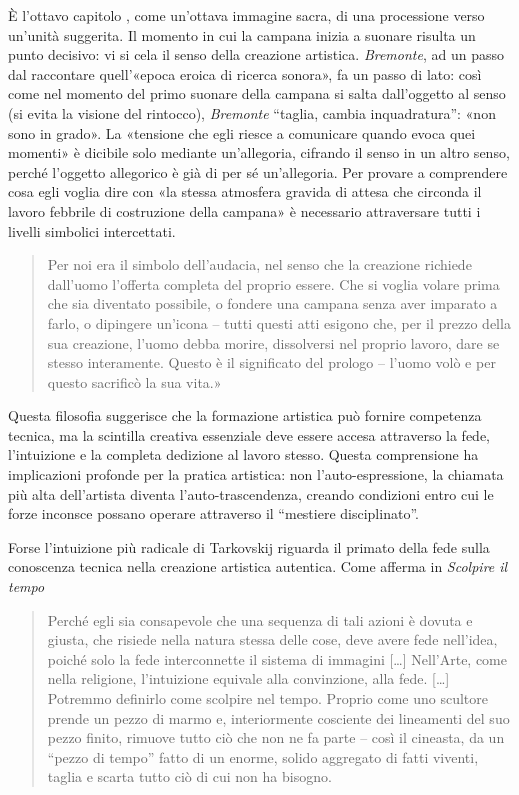 È l'ottavo capitolo \cite{tarkovskij1966}, come un'ottava immagine sacra, di una processione verso un'unità
suggerita. Il momento in cui la campana inizia a suonare risulta un
punto decisivo: vi si cela il senso della creazione artistica. \emph{Bremonte},
ad un passo dal raccontare quell'«epoca eroica di ricerca sonora», fa un
passo di lato: così come nel momento del primo suonare della
campana si salta dall'oggetto al senso (si evita la visione del rintocco), \emph{Bremonte} “taglia, cambia inquadratura”: «non sono in grado». La «tensione
che egli riesce a comunicare quando evoca quei momenti» è dicibile solo mediante
un'allegoria, cifrando il senso in un altro senso, perché l'oggetto allegorico è
già di per sé un'allegoria. Per provare a comprendere cosa egli voglia dire con «la
stessa atmosfera gravida di attesa che circonda il lavoro febbrile di
costruzione della campana» è necessario attraversare tutti i livelli simbolici
intercettati.

\begin{quote}
  Per noi era il simbolo dell'audacia, nel senso che la creazione richiede
  dall'uomo l'offerta completa del proprio essere. Che si voglia volare prima
  che sia diventato possibile, o fondere una campana senza aver imparato a
  farlo, o dipingere un'icona -- tutti questi atti esigono che, per il prezzo della
  sua creazione, l'uomo debba morire, dissolversi nel proprio lavoro, dare se
  stesso interamente. Questo è il significato del prologo -- l'uomo volò e per
  questo sacrificò la sua vita.» \cite{ciment69}
\end{quote}

Questa filosofia suggerisce che la formazione artistica può fornire competenza
tecnica, ma la scintilla creativa essenziale deve essere accesa attraverso la
fede, l'intuizione e la completa dedizione al lavoro stesso.  Questa comprensione
ha implicazioni profonde per la pratica artistica: non l'auto-espressione, la
chiamata più alta dell'artista diventa l'auto-trascendenza, creando condizioni
entro cui le forze inconsce possano operare attraverso il “mestiere disciplinato”.

Forse l'intuizione più radicale di Tarkovskij riguarda il primato della fede
sulla conoscenza tecnica nella creazione artistica autentica. Come afferma in
\emph{Scolpire il tempo}

\begin{quote}
  Perché egli sia consapevole che una sequenza di tali azioni è dovuta e giusta,
  che risiede nella natura stessa delle cose, deve avere fede nell'idea, poiché solo
  la fede interconnette il sistema di immagini [\ldots] Nell'Arte, come nella
  religione, l'intuizione equivale alla convinzione, alla fede. [\ldots] Potremmo
  definirlo come scolpire nel tempo. Proprio come uno scultore prende un pezzo di
  marmo e, interiormente cosciente dei lineamenti del suo pezzo finito, rimuove tutto
  ciò che non ne fa parte -- così il cineasta, da un “pezzo di tempo” fatto di un enorme,
  solido aggregato di fatti viventi, taglia e scarta tutto ciò di cui non ha bisogno.
\end{quote}

